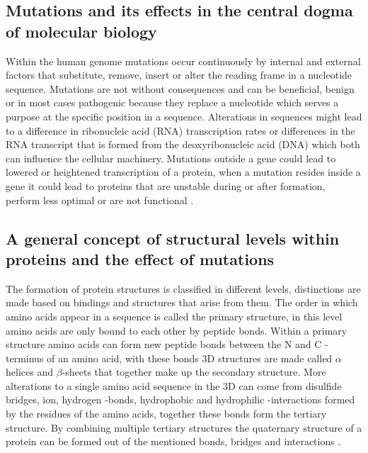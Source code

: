 \subsection{Mutations and its effects in the central dogma of molecular biology}
Within the human genome mutations occur continuously by internal and external factors that substitute, remove, insert or alter the reading frame in a nucleotide sequence. Mutations are not without consequences and can be \cite{mail} beneficial, benign or in most cases pathogenic because they replace a nucleotide which serves a purpose at the specific position in a sequence. Alterations in sequences might lead to a difference in ribonucleic acid (RNA) transcription rates or differences in the RNA transcript that is formed from the deoxyribonucleic acid (DNA) which both can influence the cellular machinery. Mutations outside a gene could lead to lowered or heightened transcription of a protein, when a mutation resides inside a gene it could lead to proteins that are unstable during or after formation, perform less optimal or are not functional \cite{nih_sickle_nodate,nih_cystic_nodate,nih_traps_2016}.

\subsection{A general concept of structural levels within proteins and the effect of mutations}
The formation of protein structures is classified in different levels, distinctions are made based on bindings and structures that arise from them. 
The order in which amino acids appear in a sequence is called the primary structure, in this level amino acids are only bound to each other by peptide bonds. 
Within a primary structure amino acids can form new peptide bonds between the N and C -terminus of an amino acid, with these bonds 3D structures are made called $\alpha$ helices and $\beta$-sheets that together make up the secondary structure.
More alterations to a single amino acid sequence in the 3D can come from disulfide bridges, ion, hydrogen -bonds, hydrophobic and hydrophilic -interactions formed by the residues of the amino acids, together these bonds form the tertiary structure.
By combining multiple tertiary structures the quaternary structure of a protein can be formed out of the mentioned bonds, bridges and interactions \cite{wikipedia_protein_2019, bennion_protein_2002}.

